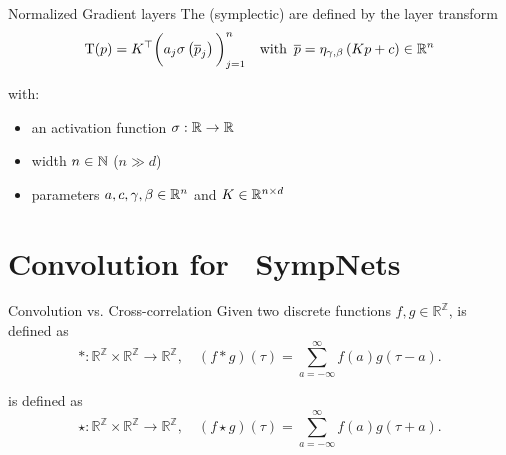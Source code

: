 \begin{frame}[c]{Normalized Gradient layers}
  The (symplectic)  are defined by the layer transform
  \begin{equation*}
		\mathrm{T}(p) = K^\top \bigg( a_j \sigma
		\left( \overline{p}_j \right) \bigg)_{j=1}^n
		\quad \text{with } \, \overline{p} = \eta_{\gamma, \beta} \left( Kp + c \right) \in \mathbb{R}^n
	\end{equation*}

  with:
  \begin{itemize}
    \item an activation function $\sigma : \mathbb{R} \to \mathbb{R}$
    \item width $n \in \mathbb{N}$ ($n \gg d$)
    \item parameters $a,c,\gamma, \beta \in \mathbb{R}^n$ and $K \in \mathbb{R}^{n \times d}$
  \end{itemize}
\end{frame}

\section{Convolution for ~\newline SympNets}

\begin{frame}[c]{Convolution vs. Cross-correlation}
  Given two discrete functions $f,g \in \mathbb{R}^\mathbb{Z}$, 
   is defined as 
  \begin{equation*}
    *: \mathbb{R}^{\mathbb{Z}} \times \mathbb{R}^{\mathbb{Z}} \to \mathbb{R}^{\mathbb{Z}},
    \quad (f*g)(\tau) = \sum^{\infty}_{a=-\infty} f(a) g(\tau - a)
    .
  \end{equation*}

   is defined as
  \begin{equation*}
    \star: \mathbb{R}^{\mathbb{Z}} \times \mathbb{R}^{\mathbb{Z}} \to \mathbb{R}^{\mathbb{Z}},
    \quad (f \star g)(\tau) = \sum^{\infty}_{a=-\infty} f(a) g(\tau + a)
    .
  \end{equation*}
\end{frame}

